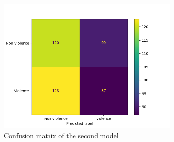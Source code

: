 \begin{figure}[]
    \centering
    \includegraphics[width=0.8\textwidth]{images/731a-simple4augnozoom-b538-conf_matrix.png}
    \caption{Confusion matrix of the second model}
    \label{fig:Second2DCNNMatrix}
\end{figure}


